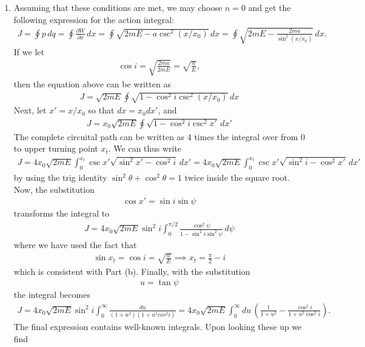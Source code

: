 \documentclass{article}
\theoremstyle{definition}
\newcommand{\p}{\partial}
\newcommand{\f}[2]{\frac{#1}{#2}}
\newcommand{\lp}{\left(}
\newcommand{\rp}{\right)}
\begin{document}
\begin{enumerate}[label=(\alph*)]
	
	\item Assuming that these conditions are met, we may choose $n=0$ and get the following expression for the action integral:
	\begin{align*}
	J = \oint p\,dq = \oint \f{\p W}{\p x}\,dx = \oint \sqrt{2mE - a\csc^2(x/x_0)}\,dx = \oint \sqrt{2mE - \f{2ma}{\sin^2(x/x_0)}}\,dx.
	\end{align*}
	If we let
	\begin{align*}
	\cos i = \sqrt{\f{2ma}{2mE}} = \sqrt{\f{a}{E}},
	\end{align*}
	then the equation above can be written as
	\begin{align*}
	J = \sqrt{2mE}\oint \sqrt{1- \cos^2 i \csc^2(x/x_0)}\,dx
	\end{align*}
	Next, let $x' = x/x_0$ so that $dx = x_0 dx'$, and
	\begin{align*}
	J = x_0\sqrt{2mE}\oint \sqrt{1- \cos^2 i \csc^2 x'}\,dx'
	\end{align*}
	The complete circuital path can be written as 4 times the integral over from $0$ to upper turning point $x_t$. We can thus write
	\begin{align*}
	J = 4x_0\sqrt{2mE}\int_0^{x_t} \csc x' \sqrt{\sin^2 x' - \cos^2 i }\,dx'  = 4x_0\sqrt{2mE}\int_0^{x_t} \csc x' \sqrt{\sin^2 i - \cos^2 x' }\,dx'
	\end{align*}
	by using the trig identity $\sin^2\theta + \cos^2\theta = 1$ twice inside the square root. Now, the substitution 
	\begin{align*}
	\cos x' = \sin i \sin\psi
	\end{align*}
	transforms the integral to 
	\begin{align*}
	J = 4x_0\sqrt{2mE}\sin^2 i \int_0^{\pi/2} \f{\cos^2\psi }{1-\sin^2 i \sin^2\psi}   \,d\psi
	\end{align*}
	where we have used the fact that 
	\begin{align*}
	\sin x_t = \cos i = \sqrt{\f{a}{E}}\implies x_t = \f{\pi}{2} - i
	\end{align*}
	which is consistent with Part (b). Finally, with the substitution
	\begin{align*}
	u = \tan\psi
	\end{align*}
	the integral becomes
	\begin{align*}
	J = 4x_0\sqrt{2mE} \sin^2 i \int_0^\infty \f{du}{(1+u^2)(1+u^2cos^2i)} = 4x_0\sqrt{2mE} \int_0^\infty du\,\lp \f{1}{1+u^2} - \f{\cos^2 i}{1 + u^2\cos^2 i} \rp.
	\end{align*}
	The final expression contains well-known integrals. Upon looking these up we find 

\end{enumerate}
\end{document}
